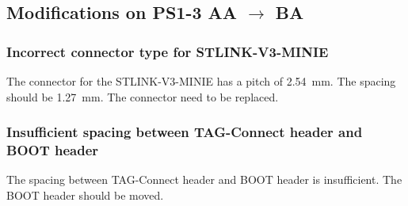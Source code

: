 \subsection{Modifications on PS1-3 AA $\to$ BA}

\subsubsection{Incorrect connector type for STLINK-V3-MINIE}
The connector for the STLINK-V3-MINIE has a pitch of \qty{2.54}{\milli\meter}. The spacing should be \qty{1.27}{\milli\meter}. The connector need to be replaced. 

\subsubsection{Insufficient spacing between TAG-Connect header and BOOT header}
The spacing between TAG-Connect header and BOOT header is insufficient. The BOOT header should be moved. 

